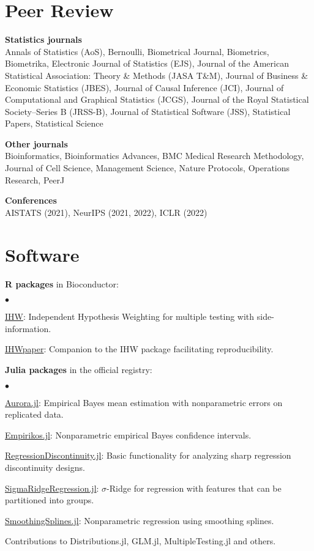 \documentclass[margin,line]{res}
\newcommand{\ver}{\vspace*{-2.7mm}}
\newenvironment{list2}{
  \begin{list}{$\bullet$}{%
      \setlength{\itemsep}{0in}
      \setlength{\parsep}{0in} \setlength{\parskip}{0in}
      \setlength{\topsep}{0in} \setlength{\partopsep}{0in}
      \setlength{\leftmargin}{0.2in}}}{\end{list}}
\begin{document}
\begin{resume}
\section{\sc Peer Review}

\textbf{Statistics journals}\\
Annals of Statistics (AoS),
Bernoulli,
Biometrical Journal,
Biometrics,
Biometrika,
Electronic Journal of Statistics (EJS),
Journal of the American Statistical Association: Theory \& Methods (JASA T\&M),
Journal of Business \& Economic Statistics (JBES),
Journal of Causal Inference (JCI),
Journal of Computational and Graphical Statistics (JCGS),
Journal of the Royal Statistical Society--Series B (JRSS-B),
Journal of Statistical Software (JSS),
Statistical Papers,
Statistical Science

\ver

\textbf{Other journals}\\
Bioinformatics,
Bioinformatics Advances,
BMC Medical Research Methodology,
Journal of Cell Science,
Management Science,
Nature Protocols,
Operations Research,
PeerJ

\ver
\textbf{Conferences}\\
AISTATS (2021),
NeurIPS (2021, 2022),
ICLR (2022)

\section{\sc Software}
{\bf R packages} in Bioconductor:
\begin{list2}
\item \href{https://bioconductor.org/packages/IHW}{{\color{urlblue} IHW}}:  Independent Hypothesis Weighting for multiple testing with side-information.
\item \href{https://bioconductor.org/packages/IHWpaper}{{\color{urlblue} IHWpaper}}: Companion to the IHW package facilitating reproducibility.
\end{list2}
{\bf Julia packages} in the official registry:
\begin{list2}
\item \href{https://github.com/nignatiadis/Aurora.jl}{{\color{urlblue} Aurora.jl}}: Empirical Bayes mean estimation with nonparametric errors on replicated data.
\item \href{https://github.com/nignatiadis/Empirikos.jl}{{\color{urlblue} Empirikos.jl}}: Nonparametric empirical Bayes confidence intervals.
\item \href{https://github.com/nignatiadis/RegressionDiscontinuity.jl}{{\color{urlblue}  RegressionDiscontinuity.jl}}: Basic functionality for analyzing sharp regression discontinuity designs.
\item \href{https://github.com/nignatiadis/SigmaRidgeRegression.jl}{{\color{urlblue} SigmaRidgeRegression.jl}}: $\sigma$-Ridge for regression with features that can be partitioned into groups.
\item \href{https://github.com/nignatiadis/SmoothingSplines.jl}{{\color{urlblue} SmoothingSplines.jl}}: Nonparametric regression using smoothing splines.
\item Contributions to Distributions.jl, GLM.jl, MultipleTesting.jl and others.
\end{list2}



\end{resume}
\end{document}
